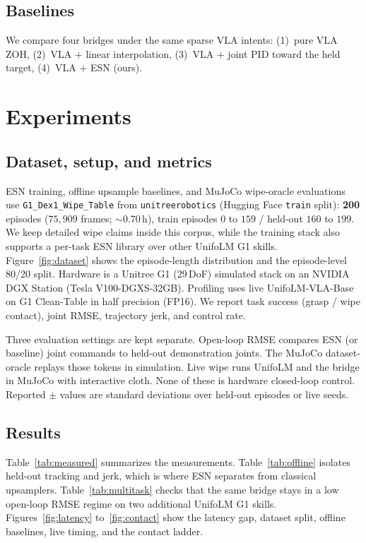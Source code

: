 \documentclass{article}
\begin{document}
\subsection{Baselines}
We compare four bridges under the same sparse VLA intents:
(1)~pure VLA ZOH,
(2)~VLA $+$ linear interpolation,
(3)~VLA $+$ joint PID toward the held target,
(4)~VLA $+$ ESN (ours).

\section{Experiments}
\subsection{Dataset, setup, and metrics}
\label{sec:dataset}
ESN training, offline upsample baselines, and MuJoCo wipe-oracle evaluations use
\texttt{G1\_Dex1\_Wipe\_Table} from \texttt{unitreerobotics} (Hugging Face \texttt{train} split):
\textbf{200} episodes ($75{,}909$ frames; $\sim$0.70\,h), train episodes $0$ to $159$ / held-out $160$ to $199$.
We keep detailed wipe claims inside this corpus, while the training stack also supports a per-task ESN library over other UnifoLM G1 skills.
Figure~\ref{fig:dataset} shows the episode-length distribution and the episode-level 80/20 split.
Hardware is a Unitree G1 (29\,DoF) simulated stack on an NVIDIA DGX Station (Tesla V100-DGXS-32GB).
Profiling uses live UnifoLM-VLA-Base on G1 Clean-Table in half precision (FP16).
We report task success (grasp / wipe contact), joint RMSE, trajectory jerk, and control rate.

Three evaluation settings are kept separate.
Open-loop RMSE compares ESN (or baseline) joint commands to held-out demonstration joints.
The MuJoCo dataset-oracle replays those tokens in simulation.
Live wipe runs UnifoLM and the bridge in MuJoCo with interactive cloth.
None of these is hardware closed-loop control.
Reported $\pm$ values are standard deviations over held-out episodes or live seeds.

\subsection{Results}
Table~\ref{tab:measured} summarizes the measurements.
Table~\ref{tab:offline} isolates held-out tracking and jerk, which is where ESN separates from classical upsamplers.
Table~\ref{tab:multitask} checks that the same bridge stays in a low open-loop RMSE regime on two additional UnifoLM G1 skills.
Figures~\ref{fig:latency} to~\ref{fig:contact} show the latency gap, dataset split, offline baselines, live timing, and the contact ladder.
\end{document}
